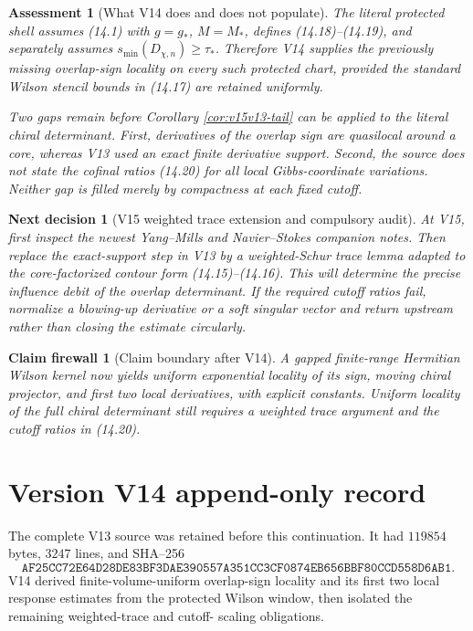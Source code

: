 \documentclass[11pt]{article}
\newtheorem{firewall}[theorem]{Claim firewall}
\newtheorem{decision}[theorem]{Next decision}
\newtheorem{assessment}[theorem]{Assessment}
\theoremstyle{remark}
\begin{document}
\begin{assessment}[What V14 does and does not populate]
\label{ass:v15v14-source}
The literal protected shell assumes (14.1) with
\(g=g_*\), \(M=M_*\), defines (14.18)--(14.19), and separately
assumes \(s_{\min}(D_{\chi,n})\ge\tau_*\).  Therefore V14 supplies
the previously missing overlap-sign locality on every such
protected chart, provided the standard Wilson stencil bounds in
(14.17) are retained uniformly.

Two gaps remain before Corollary \ref{cor:v15v13-tail} can be
applied to the literal chiral determinant.  First, derivatives of
the overlap sign are quasilocal around a core, whereas V13 used an
exact finite derivative support.  Second, the source does not state
the cofinal ratios (14.20) for all local Gibbs-coordinate
variations.  Neither gap is filled merely by compactness at each
fixed cutoff.
\end{assessment}

\begin{decision}[V15 weighted trace extension and compulsory audit]
\label{dec:v15v14-next}
At V15, first inspect the newest Yang--Mills and Navier--Stokes
companion notes.  Then replace the exact-support step in V13 by a
weighted-Schur trace lemma adapted to the core-factorized contour
form (14.15)--(14.16).  This will determine the precise influence
debit of the overlap determinant.  If the required cutoff ratios
fail, normalize a blowing-up derivative or a soft singular vector
and return upstream rather than closing the estimate circularly.
\end{decision}

\begin{firewall}[Claim boundary after V14]
\label{fire:v15v14}
A gapped finite-range Hermitian Wilson kernel now yields uniform
exponential locality of its sign, moving chiral projector, and
first two local derivatives, with explicit constants.  Uniform
locality of the full chiral determinant still requires a weighted
trace argument and the cutoff ratios in (14.20).
\end{firewall}

\section*{Version V14 append-only record}
The complete V13 source was retained before this continuation.  It
had \(119854\) bytes, \(3247\) lines, and SHA--256
\[
 \texttt{AF25CC72E64D28DE83BF3DAE390557A351CC3CF0874EB656BBF80CCD558D6AB1}.
\]
V14 derived finite-volume-uniform overlap-sign locality and its
first two local response estimates from the protected Wilson
window, then isolated the remaining weighted-trace and cutoff-
scaling obligations.
\end{document}
